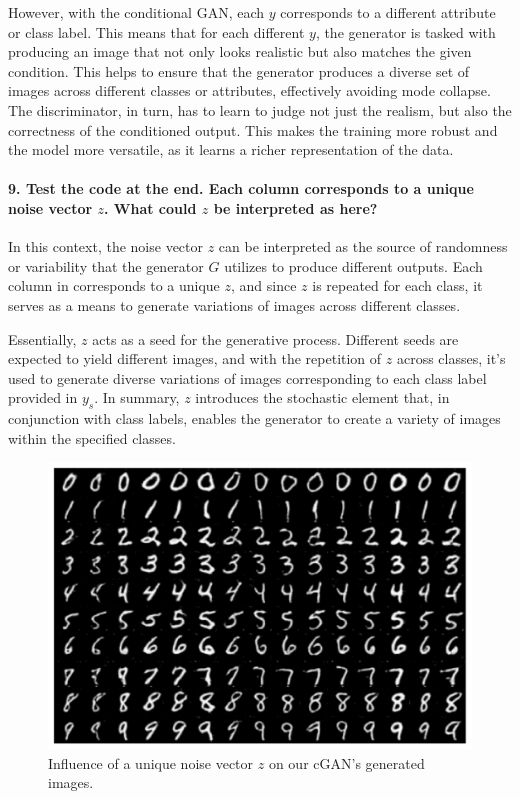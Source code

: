 However, with the conditional GAN, each $ y $ corresponds to a different attribute or class label. This means that for each different $ y $, the generator is tasked with producing an image that not only looks realistic but also matches the given condition. This helps to ensure that the generator produces a diverse set of images across different classes or attributes, effectively avoiding mode collapse. The discriminator, in turn, has to learn to judge not just the realism, but also the correctness of the conditioned output. This makes the training more robust and the model more versatile, as it learns a richer representation of the data.

\paragraph*{9. Test the code at the end. Each column corresponds to a unique noise vector $z$. What could $z$ be interpreted as here?}

In this context, the noise vector $z$ can be interpreted as the source of randomness or variability that the generator $G$ utilizes to produce different outputs. Each column in  corresponds to a unique $z$, and since $z$ is repeated for each class, it serves as a means to generate variations of images across different classes.

Essentially, $z$ acts as a seed for the generative process. Different seeds are expected to yield different images, and with the repetition of $z$ across classes, it's used to generate diverse variations of images corresponding to each class label provided in $y_s$. In summary, $z$ introduces the stochastic element that, in conjunction with class labels, enables the generator to create a variety of images within the specified classes.

\begin{figure}[H]
    \centering
    \includegraphics[width=.8\textwidth]{impact_of_z}
    \caption{Influence of a unique noise vector $z$ on our cGAN's generated images.}
    \label{fig:impact_of_z}
\end{figure}